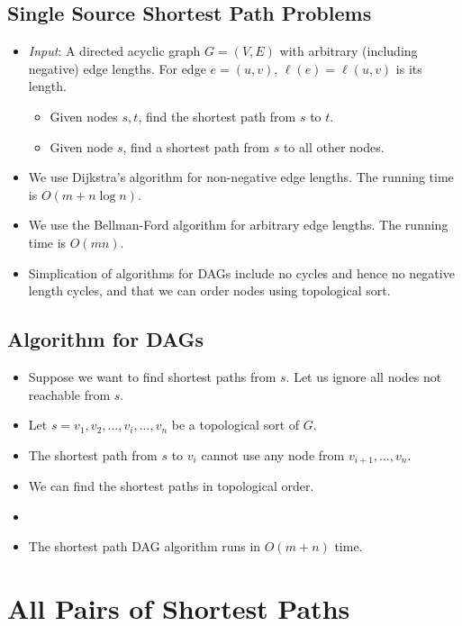 \subsection{Single Source Shortest Path Problems}
\begin{itemize}
    \item \textit{Input}: A directed acyclic graph $G = (V, E)$ with arbitrary (including negative) edge lengths. For edge $e = (u, v)$, $\ell(e) = \ell(u, v)$ is its length.
    \begin{itemize}
        \item Given nodes $s, t$, find the shortest path from $s$ to $t$.
        \item Given node $s$, find a shortest path from $s$ to all other nodes.
    \end{itemize}
    \item We use Dijkstra's algorithm for non-negative edge lengths. The running time is $O(m + n\log n)$.
    \item We use the Bellman-Ford algorithm for arbitrary edge lengths. The running time is $O(mn)$.
    \item Simplication of algorithms for DAGs include no cycles and hence no negative length cycles, and that we can order nodes using topological sort.
\end{itemize}

\subsection{Algorithm for DAGs}
\begin{itemize}
    \item Suppose we want to find shortest paths from $s$. Let us ignore all nodes not reachable from $s$.
    \item Let $s = v_1, v_2, ..., v_{i}, ..., v_n$ be a topological sort of $G$.
    \item The shortest path from $s$ to $v_i$ cannot use any node from $v_{i + 1}, ..., v_n$.
    \item We can find the shortest paths in topological order.
    \item[] 
    \item The shortest path DAG algorithm runs in $O(m + n)$ time.
\end{itemize}

\section{All Pairs of Shortest Paths}

